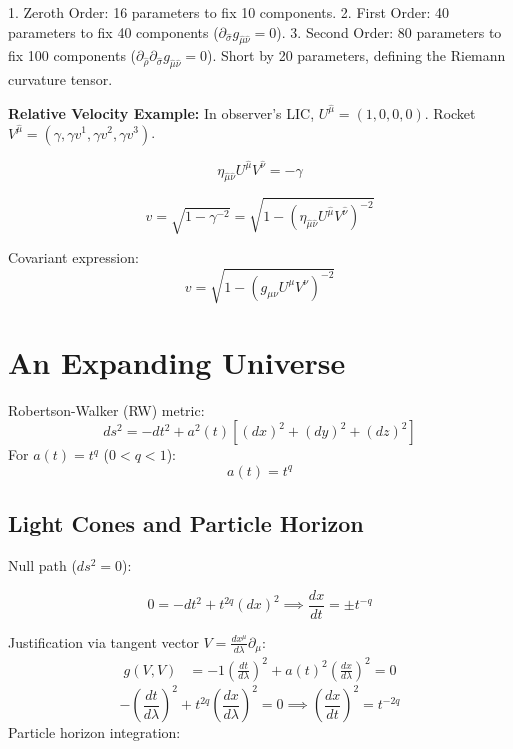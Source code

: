\documentclass[11pt, a4paper]{report}
\begin{document}
1. Zeroth Order: 16 parameters to fix 10 components.
2. First Order: 40 parameters to fix 40 components ($\partial_{\hat{\sigma}} g_{\hat{\mu}\hat{\nu}} = 0$).
3. Second Order: 80 parameters to fix 100 components ($\partial_{\hat{\rho}}\partial_{\hat{\sigma}} g_{\hat{\mu}\hat{\nu}} = 0$). Short by 20 parameters, defining the Riemann curvature tensor.



\textbf{Relative Velocity Example:}
In observer's LIC, $U^{\hat{\mu}} = (1, 0, 0, 0)$. Rocket $V^{\hat{\mu}} = (\gamma, \gamma v^1, \gamma v^2, \gamma v^3)$.


$$ \eta_{\hat{\mu}\hat{\nu}} U^{\hat{\mu}} V^{\hat{\nu}} = -\gamma $$

$$ v = \sqrt{1 - \gamma^{-2}} = \sqrt{1 - ( \eta_{\hat{\mu}\hat{\nu}} U^{\hat{\mu}} V^{\hat{\nu}} )^{-2}} $$

Covariant expression:
\begin{equation} v = \sqrt{1 - (g_{\mu\nu} U^\mu V^\nu)^{-2}} \end{equation}

\section{An Expanding Universe}
Robertson-Walker (RW) metric:
\begin{equation}\label{eq:rw-metric} ds^2 = -dt^2 + a^2(t)[(dx)^2 + (dy)^2 + (dz)^2] \end{equation}
For $a(t) = t^q$ ($0 < q < 1$):
\begin{equation} a(t) = t^q \end{equation}

\subsection*{Light Cones and Particle Horizon}
Null path ($ds^2=0$):


$$ 0 = -dt^2 + t^{2q} (dx)^2 \implies \frac{dx}{dt} = \pm t^{-q} $$


Justification via tangent vector $V = \frac{dx^\mu}{d\lambda} \partial_\mu$:
\begin{align*}
g(V,V) &= -1 \left(\frac{dt}{d\lambda}\right)^2 + a(t)^2 \left(\frac{dx}{d\lambda}\right)^2 = 0
\end{align*}
\begin{equation} -\left(\frac{dt}{d\lambda}\right)^2 + t^{2q} \left(\frac{dx}{d\lambda}\right)^2 = 0 \implies \left(\frac{dx}{dt}\right)^2 = t^{-2q} \end{equation}
Particle horizon integration:
\end{document}
